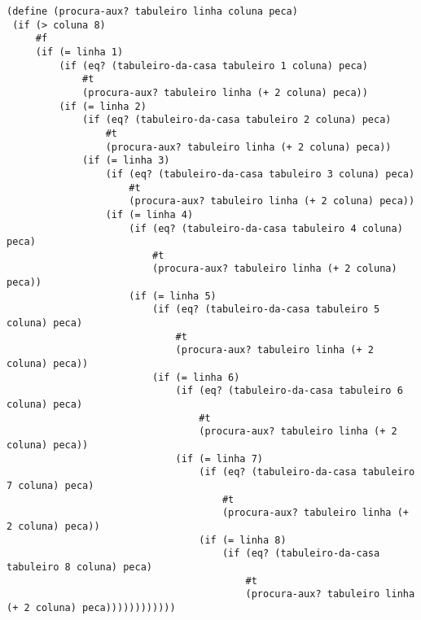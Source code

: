 \begin{lstlisting}[basicstyle=\ttfamily, caption="example"]
(define (procura-aux? tabuleiro linha coluna peca)
 (if (> coluna 8)
     #f
     (if (= linha 1)
         (if (eq? (tabuleiro-da-casa tabuleiro 1 coluna) peca)
             #t
             (procura-aux? tabuleiro linha (+ 2 coluna) peca))
         (if (= linha 2)
             (if (eq? (tabuleiro-da-casa tabuleiro 2 coluna) peca)
                 #t
                 (procura-aux? tabuleiro linha (+ 2 coluna) peca))
             (if (= linha 3)
                 (if (eq? (tabuleiro-da-casa tabuleiro 3 coluna) peca)
                     #t
                     (procura-aux? tabuleiro linha (+ 2 coluna) peca))
                 (if (= linha 4)
                     (if (eq? (tabuleiro-da-casa tabuleiro 4 coluna) peca)
                         #t
                         (procura-aux? tabuleiro linha (+ 2 coluna) peca))
                     (if (= linha 5)
                         (if (eq? (tabuleiro-da-casa tabuleiro 5 coluna) peca)
                             #t
                             (procura-aux? tabuleiro linha (+ 2 coluna) peca))
                         (if (= linha 6)
                             (if (eq? (tabuleiro-da-casa tabuleiro 6 coluna) peca)
                                 #t
                                 (procura-aux? tabuleiro linha (+ 2 coluna) peca))
                             (if (= linha 7)
                                 (if (eq? (tabuleiro-da-casa tabuleiro 7 coluna) peca)
                                     #t
                                     (procura-aux? tabuleiro linha (+ 2 coluna) peca))
                                 (if (= linha 8)
                                     (if (eq? (tabuleiro-da-casa tabuleiro 8 coluna) peca)
                                         #t
                                         (procura-aux? tabuleiro linha (+ 2 coluna) peca))))))))))))

                                         \end{lstlisting}

